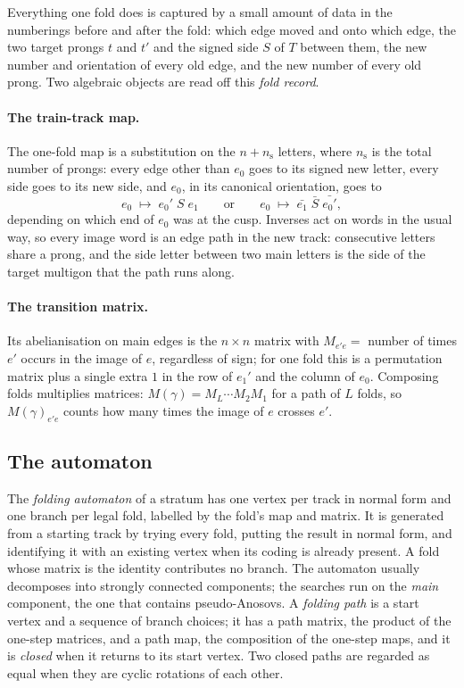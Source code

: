 \documentclass[12pt]{amsart}
\newcommand{\anti}[1]{\bar{#1}}          %
\theoremstyle{plain}
\theoremstyle{definition}
\begin{document}
Everything one fold does is captured by a small amount of data in the
numberings before and after the fold: which edge moved and onto which
edge, the two target prongs $t$ and $t'$ and the signed side $S$ of $T$
between them, the new number and orientation of every old edge, and the
new number of every old prong.  Two algebraic objects are read off this
\emph{fold record}.

\paragraph{The train-track map.}
The one-fold map is a substitution on the $n+n_{\mathrm{s}}$ letters,
where $n_{\mathrm{s}}$ is the total number of prongs: every edge other
than $e_0$ goes to its signed new letter, every side goes to its new
side, and $e_0$, in its canonical orientation, goes to
\[
  e_0 \;\longmapsto\; e_0'\;S\;e_1
  \qquad\text{or}\qquad
  e_0 \;\longmapsto\; \anti{e_1}\;\anti S\;\anti{e_0'},
\]
depending on which end of $e_0$ was at the cusp.  Inverses act on words
in the usual way, so every image word is an edge path in the new track:
consecutive letters share a prong, and the side letter between two main
letters is the side of the target multigon that the path runs along.

\paragraph{The transition matrix.}
Its abelianisation on main edges is the $n\times n$ matrix with
$M_{e'e}=$ number of times $e'$ occurs in the image of $e$, regardless of
sign; for one fold this is a permutation matrix plus a single extra $1$
in the row of $e_1'$ and the column of $e_0$.  Composing folds
multiplies matrices: $M(\gamma)=M_L\cdots M_2M_1$ for a path of $L$
folds, so $M(\gamma)_{e'e}$ counts how many times the image of $e$
crosses $e'$.

\subsection{The automaton}
\label{sec:automaton}
The \emph{folding automaton} of a stratum has one vertex per track in
normal form and one branch per legal fold, labelled by the fold's map and
matrix.  It is generated from a starting track by trying every fold,
putting the result in normal form, and identifying it with an existing
vertex when its coding is already present.  A fold whose matrix is the
identity contributes no branch.  The automaton usually decomposes into
strongly connected components; the searches run on the \emph{main}
component, the one that contains pseudo-Anosovs.  A \emph{folding path}
is a start vertex and a sequence of branch choices; it has a path matrix,
the product of the one-step matrices, and a path map, the composition of
the one-step maps, and it is \emph{closed} when it returns to its start
vertex.  Two closed paths are regarded as equal when they are cyclic
rotations of each other.
\end{document}
